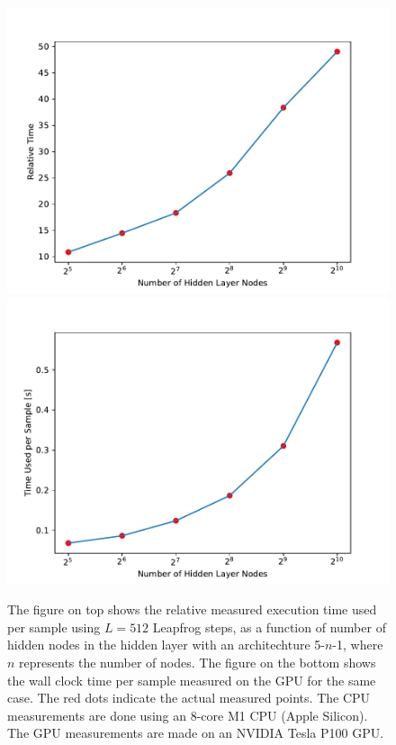 \begin{figure}[h!]
    \centering
    \includegraphics[scale=0.7]{figures/cpu_vs_gpu/cpu_vs_gpu_performance.pdf}
    \includegraphics[scale=0.7]{figures/cpu_vs_gpu/gpu_training_time.pdf}
    \caption{The figure on top shows the relative measured execution time used per sample using $L = 512$ Leapfrog steps,
    as a function of number of hidden nodes in the hidden layer with an architechture 5-$n$-1, where $n$ represents the number of nodes. The figure on the bottom shows the wall clock time per sample measured on the GPU for the same case. The red dots indicate the actual measured points. The CPU measurements are done using an 8-core M1 CPU (Apple Silicon). The GPU measurements
    are made on an NVIDIA Tesla P100 GPU.
    }
    \label{fig:relative_performance}
\end{figure}

